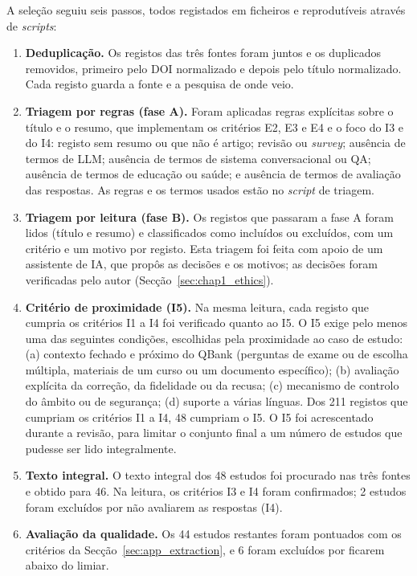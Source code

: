 A seleção seguiu seis passos, todos registados em ficheiros e reprodutíveis através de \emph{scripts}:
\begin{enumerate}
    \item \textbf{Deduplicação.} Os registos das três fontes foram juntos e os duplicados removidos, primeiro pelo DOI normalizado e depois pelo título normalizado. Cada registo guarda a fonte e a pesquisa de onde veio.
    \item \textbf{Triagem por regras (fase A).} Foram aplicadas regras explícitas sobre o título e o resumo, que implementam os critérios E2, E3 e E4 e o foco do I3 e do I4: registo sem resumo ou que não é artigo; revisão ou \emph{survey}; ausência de termos de \gls{LLM}; ausência de termos de sistema conversacional ou \gls{QA}; ausência de termos de educação ou saúde; e ausência de termos de avaliação das respostas. As regras e os termos usados estão no \emph{script} de triagem.
    \item \textbf{Triagem por leitura (fase B).} Os registos que passaram a fase A foram lidos (título e resumo) e classificados como incluídos ou excluídos, com um critério e um motivo por registo. Esta triagem foi feita com apoio de um assistente de \gls{IA}, que propôs as decisões e os motivos; as decisões foram verificadas pelo autor (Secção~\ref{sec:chap1_ethics}). %
    \item \textbf{Critério de proximidade (I5).} Na mesma leitura, cada registo que cumpria os critérios I1 a I4 foi verificado quanto ao I5. O I5 exige pelo menos uma das seguintes condições, escolhidas pela proximidade ao caso de estudo: (a) contexto fechado e próximo do QBank (perguntas de exame ou de escolha múltipla, materiais de um curso ou um documento específico); (b) avaliação explícita da correção, da fidelidade ou da recusa; (c) mecanismo de controlo do âmbito ou de segurança; (d) suporte a várias línguas. Dos 211 registos que cumpriam os critérios I1 a I4, 48 cumpriam o I5. O I5 foi acrescentado durante a revisão, para limitar o conjunto final a um número de estudos que pudesse ser lido integralmente.
    \item \textbf{Texto integral.} O texto integral dos 48 estudos foi procurado nas três fontes e obtido para 46. Na leitura, os critérios I3 e I4 foram confirmados; 2 estudos foram excluídos por não avaliarem as respostas (I4).
    \item \textbf{Avaliação da qualidade.} Os 44 estudos restantes foram pontuados com os critérios da Secção~\ref{sec:app_extraction}, e 6 foram excluídos por ficarem abaixo do limiar.
\end{enumerate}

